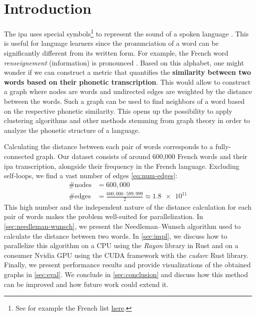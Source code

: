 \section{Introduction}

The \gls{ipa} uses special symbols\footnote{See for example the French list \href{https://en.wikipedia.org/wiki/Help:IPA/French}{here}.} to represent the sound of a spoken language \cite{ipa}. This is useful for language learners since the pronunciation of a word can be significantly different from its written form. For example, the French word \textit{renseignement} (information) is pronounced . Based on this alphabet, one might wonder if we can construct a metric that quantifies the \textbf{similarity between two words based on their phonetic transcription}. This would allow to construct a graph where nodes are words and undirected edges are weighted by the distance between the words. Such a graph can be used to find neighbors of a word based on the respective phonetic similarity. This opens up the possibility to apply clustering algorithms and other methods stemming from graph theory in order to analyze the phonetic structure of a language.

Calculating the distance between each pair of words corresponds to a fully-connected graph. Our dataset consists of around 600,000 French words and their \gls{ipa} transcription, alongside their frequency in the French language. Excluding self-loops, we find a vast number of edges \eqref{eq:num-edges}:
\begin{align}
    \text{\#nodes} &= 600,000 \\
    \text{\#edges} &= \frac{600,000 \cdot 599,999}{2} \approx \num{1.8e11}
\end{align}
This high number and the independent nature of the distance calculation for each pair of words makes the problem well-suited for parallelization. In \autoref{sec:needleman-wunsch}, we present the Needleman–Wunsch algorithm used to calculate the distance between two words. In \autoref{sec:impl}, we discuss how to parallelize this algorithm on a CPU using the \textit{Rayon} library in Rust and on a consumer Nvidia GPU using the CUDA framework with the \textit{cudarc} Rust library. Finally, we present performance results and provide visualizations of the obtained graphs in \autoref{sec:eval}. We conclude in \autoref{sec:conclusion} and discuss how this method can be improved and how future work could extend it.
